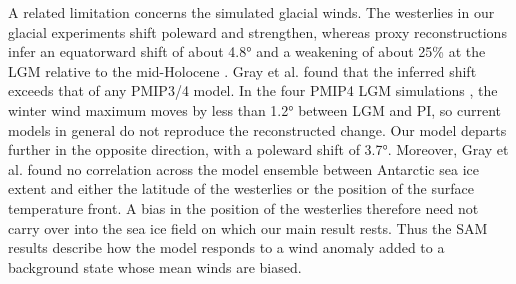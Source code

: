 \documentclass[pdflatex,sn-nature]{sn-jnl}
\begin{document}
A related limitation concerns the simulated glacial winds. The westerlies in our glacial experiments shift poleward and strengthen, whereas proxy reconstructions infer an equatorward shift of about 4.8° and a weakening of about 25\% at the LGM relative to the mid-Holocene \cite{Gray2023}. Gray et al. \cite{Gray2023} found that the inferred shift exceeds that of any PMIP3/4 model. In the four PMIP4 LGM simulations \cite{Kageyama2021}, the winter wind maximum moves by less than 1.2° between LGM and PI, so current models in general do not reproduce the reconstructed change. Our model departs further in the opposite direction, with a poleward shift of 3.7°. Moreover, Gray et al. \cite{Gray2023} found no correlation across the model ensemble between Antarctic sea ice extent and either the latitude of the westerlies or the position of the surface temperature front. A bias in the position of the westerlies therefore need not carry over into the sea ice field on which our main result rests. Thus the SAM results describe how the model responds to a wind anomaly added to a background state whose mean winds are biased.
\end{document}
